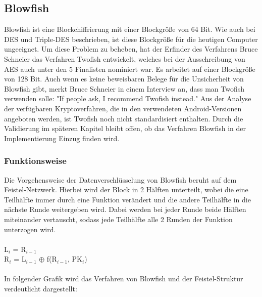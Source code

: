 \documentclass[10pt, a4paper,headsepline,pointednumbers]{scrreprt}
\begin{document}
\subsection{Blowfish}
Blowfish ist eine Blockchiffrierung mit einer Blockgröße von 64 Bit. Wie auch bei DES und Triple-DES beschrieben, ist diese Blockgröße für die heutigen Computer ungeeignet. Um diese Problem zu beheben, hat der Erfinder des Verfahrens Bruce Schneier das Verfahren Twofish entwickelt, welches bei der Ausschreibung von AES auch unter den 5 Finalisten nominiert war. Es arbeitet auf einer Blockgröße von 128 Bit. Auch wenn es keine beweisbaren Belege für die Unsicherheit von Blowfish gibt, merkt Bruce Schneier in einem Interview an, dass man Twofish verwenden solle: "If people ask, I recommend Twofish instead." \cite{website:compworld-schneier}
Aus der Analyse der verfügbaren Kryptoverfahren, die in den verwendeten Android-Versionen angeboten werden, ist Twofish noch nicht standardisiert enthalten. Durch die Validierung im späteren Kapitel bleibt offen, ob das Verfahren Blowfish in der Implementierung Einzug finden wird.

\subsubsection{Funktionsweise}
Die Vorgehensweise der Datenverschlüsselung von Blowfish beruht auf dem Feistel-Netzwerk. Hierbei wird der Block in 2 Hälften unterteilt, wobei die eine Teilhälfte immer durch eine Funktion verändert und die andere Teilhälfte in die nächste Runde weitergeben wird. Dabei werden bei jeder Runde beide Hälften miteinander vertauscht, sodass jede Teilhälfte alle 2 Runden der Funktion unterzogen wird. \\ \\
L$_{i}$ = R$_{i-1}$ \\
R$_{i}$ = L$_{i-1}$ $\oplus$ f(R$_{i-1}$, PK$_{i}$) \\ \\
In folgender Grafik wird das Verfahren von Blowfish und der Feistel-Struktur verdeutlicht dargestellt: 
\end{document}
